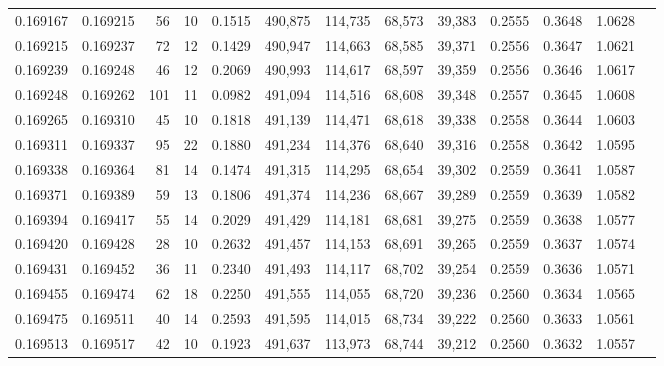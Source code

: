 \begin{tabular}{rrrrrrrrrrrrr}
0.169167 & 0.169215 &    56 &  10 &                                     0.1515 & 490,875 & 114,735 &  68,573 &  39,383 & 0.2555 & 0.3648 & 1.0628 \\
0.169215 & 0.169237 &    72 &  12 &                                     0.1429 & 490,947 & 114,663 &  68,585 &  39,371 & 0.2556 & 0.3647 & 1.0621 \\
0.169239 & 0.169248 &    46 &  12 &                                     0.2069 & 490,993 & 114,617 &  68,597 &  39,359 & 0.2556 & 0.3646 & 1.0617 \\
0.169248 & 0.169262 &   101 &  11 &                                     0.0982 & 491,094 & 114,516 &  68,608 &  39,348 & 0.2557 & 0.3645 & 1.0608 \\
0.169265 & 0.169310 &    45 &  10 &                                     0.1818 & 491,139 & 114,471 &  68,618 &  39,338 & 0.2558 & 0.3644 & 1.0603 \\
0.169311 & 0.169337 &    95 &  22 &                                     0.1880 & 491,234 & 114,376 &  68,640 &  39,316 & 0.2558 & 0.3642 & 1.0595 \\
0.169338 & 0.169364 &    81 &  14 &                                     0.1474 & 491,315 & 114,295 &  68,654 &  39,302 & 0.2559 & 0.3641 & 1.0587 \\
0.169371 & 0.169389 &    59 &  13 &                                     0.1806 & 491,374 & 114,236 &  68,667 &  39,289 & 0.2559 & 0.3639 & 1.0582 \\
0.169394 & 0.169417 &    55 &  14 &                                     0.2029 & 491,429 & 114,181 &  68,681 &  39,275 & 0.2559 & 0.3638 & 1.0577 \\
0.169420 & 0.169428 &    28 &  10 &                                     0.2632 & 491,457 & 114,153 &  68,691 &  39,265 & 0.2559 & 0.3637 & 1.0574 \\
0.169431 & 0.169452 &    36 &  11 &                                     0.2340 & 491,493 & 114,117 &  68,702 &  39,254 & 0.2559 & 0.3636 & 1.0571 \\
0.169455 & 0.169474 &    62 &  18 &                                     0.2250 & 491,555 & 114,055 &  68,720 &  39,236 & 0.2560 & 0.3634 & 1.0565 \\
0.169475 & 0.169511 &    40 &  14 &                                     0.2593 & 491,595 & 114,015 &  68,734 &  39,222 & 0.2560 & 0.3633 & 1.0561 \\
0.169513 & 0.169517 &    42 &  10 &                                     0.1923 & 491,637 & 113,973 &  68,744 &  39,212 & 0.2560 & 0.3632 & 1.0557 \\

\end{tabular}
